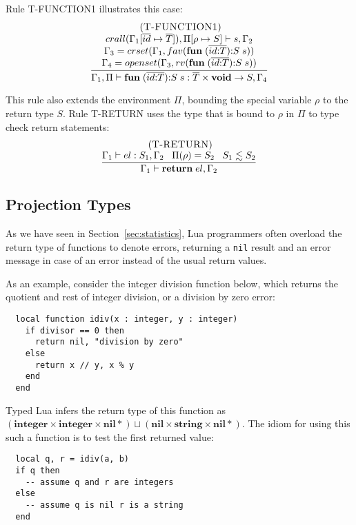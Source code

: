 \documentclass{sigplanconf}
\newcommand{\Nil}{\mathbf{nil}}
\newcommand{\Integer}{\mathbf{integer}}
\newcommand{\String}{\mathbf{string}}
\newcommand{\Void}{\mathbf{void}}
\newcommand{\mylabel}[1]{\; (\textsc{#1})}
\newcommand{\env}{\Gamma}
\newcommand{\penv}{\Pi}
\newcommand{\ret}{\rho}
\begin{document}
Rule \textsc{T-FUNCTION1} illustrates this case:
\[
\begin{array}{c}
\mylabel{T-FUNCTION1}\\
\dfrac{\begin{array}{c}
       crall(\env_{1}[\overline{id} \mapsto \overline{T}]), \penv[\ret \mapsto S] \vdash s, \env_{2}\\
       \env_{3} = crset(\env_{1}, fav(\mathbf{fun} \; (\overline{id{:}T}){:}S \; s))\\
       \env_{4} = openset(\env_{3}, rv(\mathbf{fun} \; (\overline{id{:}T}){:}S \; s))
       \end{array}}
      {\env_{1}, \penv \vdash \mathbf{fun} \; (\overline{id{:}T}){:}S \; s:\overline{T} \times \Void \rightarrow S, \env_{4}}
\end{array}
\]

This rule also extends the environment $\penv$, bounding the special
variable $\ret$ to the return type $S$.
Rule \textsc{T-RETURN} uses the type that is bound to $\ret$ in
$\penv$ to type check return statements:
\[
\begin{array}{c}
\mylabel{T-RETURN}\\
\dfrac{\env_{1} \vdash el:S_{1}, \env_{2} \;\;\;
       \penv(\ret) = S_{2} \;\;\;
       S_{1} \lesssim S_{2}}
      {\env_{1} \vdash \mathbf{return} \; el, \env_{2}}
\end{array}
\]

\subsection{Projection Types}
\label{sec:projections}

As we have seen in Section~\ref{sec:statistics}, Lua
programmers often overload the return type of functions
to denote errors, returning a {\tt nil} result and
an error message in case of an error instead of the
usual return values.

As an example, consider the integer division function
below, which returns the quotient and rest of integer
division, or a division by zero error:
\begin{verbatim}
  local function idiv(x : integer, y : integer)
    if divisor == 0 then
      return nil, "division by zero"
    else
      return x // y, x % y
    end 
  end
\end{verbatim}

Typed Lua infers the return type of this function as
$(\Integer \times \Integer \times \Nil*) \sqcup (\Nil \times \String \times \Nil{*})$. The idiom for using this such
a function is to test the first returned value:
\begin{verbatim}
  local q, r = idiv(a, b)
  if q then
    -- assume q and r are integers
  else 
    -- assume q is nil r is a string
  end
\end{verbatim}
\end{document}
